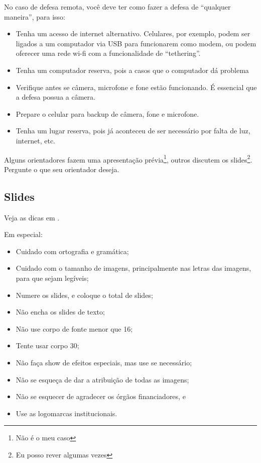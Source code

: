 No caso de defesa remota, você deve ter como fazer a defesa de ``qualquer maneira'', para isso:
\begin{itemize}
    \item Tenha um acesso de internet alternativo. Celulares, por exemplo, podem ser ligados a um computador via USB para funcionarem como modem, ou podem oferecer uma rede wi-fi com a funcionalidade de ``tethering''.
    \item Tenha um computador reserva, pois a casos que o computador dá problema
    \item Verifique antes se câmera, microfone e fone estão funcionando. É essencial que a defesa possua a câmera.
    \item Prepare o celular para backup de câmera, fone e microfone.
    \item Tenha um lugar reserva, pois já aconteceu de ser necessário por falta de luz, internet, etc. 
\end{itemize}

Alguns orientadores fazem uma apresentação prévia\footnote{Não é o meu caso}, outros discutem os slides\footnote{Eu posso rever algumas vezes}. Pergunte o que seu orientador deseja.



\subsection{Slides}

Veja as dicas em .

Em especial:
\begin{itemize}
    \item Cuidado com ortografia e gramática;
    \item Cuidado com o tamanho de imagens, principalmente nas letras das imagens, para que sejam legíveis;
    \item Numere os slides, e coloque o total de slides;
    \item Não encha os slides de texto;
    \item Não use corpo de fonte menor que 16;
    \item Tente usar corpo 30;
    \item Não faça show de efeitos especiais, mas use se necessário;
    \item Não se esqueça de dar a atribuição de todas as imagens;
    \item Não se esquecer de agradecer os órgãos financiadores, e
    \item Use as logomarcas institucionais.
\end{itemize}

